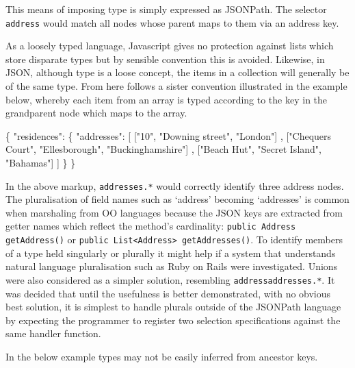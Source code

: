 \documentclass[12pt, ]{article}
\newenvironment{Shaded}{}{}
\newcommand{\StringTok}[1]{\textcolor[rgb]{0.25,0.44,0.63}{{#1}}}
\newcommand{\NormalTok}[1]{{#1}}
\begin{document}
This means of imposing type is simply expressed as JSONPath. The
selector \texttt{address} would match all nodes whose parent maps to
them via an address key.

As a loosely typed language, Javascript gives no protection against
lists which store disparate types but by sensible convention this is
avoided. Likewise, in JSON, although type is a loose concept, the items
in a collection will generally be of the same type. From here follows a
sister convention illustrated in the example below, whereby each item
from an array is typed according to the key in the grandparent node
which maps to the array.

\begin{Shaded}
\begin{Highlighting}[]
\NormalTok{\{}
   \StringTok{"residences"}\NormalTok{: \{}
      \StringTok{"addresses"}\NormalTok{: [}
         \NormalTok{[}\StringTok{"10"}\NormalTok{, }\StringTok{"Downing street"}\NormalTok{, }\StringTok{"London"}\NormalTok{]}
      \NormalTok{,  [}\StringTok{"Chequers Court"}\NormalTok{, }\StringTok{"Ellesborough"}\NormalTok{, }\StringTok{"Buckinghamshire"}\NormalTok{]      }
      \NormalTok{,  [}\StringTok{"Beach Hut"}\NormalTok{, }\StringTok{"Secret Island"}\NormalTok{, }\StringTok{"Bahamas"}\NormalTok{]}
      \NormalTok{]}
   \NormalTok{\}}
\NormalTok{\}}
\end{Highlighting}
\end{Shaded}

In the above markup, \texttt{addresses.*} would correctly identify three
address nodes. The pluralisation of field names such as `address'
becoming `addresses' is common when marshaling from OO languages because
the JSON keys are extracted from getter names which reflect the method's
cardinality: \texttt{public Address getAddress()} or
\texttt{public List\textless{}Address\textgreater{} getAddresses()}. To
identify members of a type held singularly or plurally it might help if
a system that understands natural language pluralisation such as Ruby on
Rails were investigated. Unions were also considered as a simpler
solution, resembling \texttt{address\textbar{}addresses.*}. It was
decided that until the usefulness is better demonstrated, with no
obvious best solution, it is simplest to handle plurals outside of the
JSONPath language by expecting the programmer to register two selection
specifications against the same handler function.

In the below example types may not be easily inferred from ancestor
keys.
\end{document}
